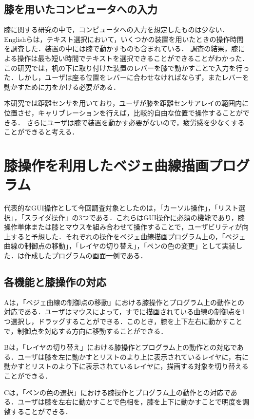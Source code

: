 \documentclass[submit, techrep]{ipsj}
\begin{document}
\subsection{膝を用いたコンピュータへの入力}
膝に関する研究の中で，コンピュータへの入力を想定したものは少ない．
Englishら\cite{1698228}は，テキスト選択において，いくつかの装置を用いたときの操作時間を調査した．装置の中には膝で動かすものも含まれている．
調査の結果，膝による操作は最も短い時間でテキストを選択できることができることがわかった．
この研究では，机の下に取り付けた装置のレバーを膝で動かすことで入力を行った．しかし，ユーザは座る位置をレバーに合わせなければならず，またレバーを動かすために力をかける必要がある．\par
本研究では距離センサを用いており，ユーザが膝を距離センサアレイの範囲内に位置させ，キャリブレーションを行えば，比較的自由な位置で操作することができる．
さらにユーザは膝で装置を動かす必要がないので，疲労感を少なくすることができると考える．

\section{膝操作を利用したベジェ曲線描画プログラム}
代表的なGUI操作として今回調査対象としたのは，「カーソル操作」，「リスト選択」，「スライダ操作」の3つである．これらはGUI操作に必須の機能であり，膝操作単体または膝とマウスを組み合わせて操作することで，ユーザビリティが向上すると予想した．それぞれの操作をベジェ曲線描画プログラム上の，「ベジェ曲線の制御点の移動」，「レイヤの切り替え」，「ペンの色の変更」として実装した．は作成したプログラムの画面一例である．
\subsection{各機能と膝操作の対応}
Aは，「ベジェ曲線の制御点の移動」における膝操作とプログラム上の動作との対応である．ユーザはマウスによって，すでに描画されている曲線の制御点を1つ選択し，ドラッグすることができる．このとき，膝を上下左右に動かすことで，制御点を対応する方向に移動することができる．\par
{}Bは，「レイヤの切り替え」における膝操作とプログラム上の動作との対応である．ユーザは膝を左に動かすとリストのより上に表示されているレイヤに，右に動かすとリストのより下に表示されているレイヤに，描画する対象を切り替えることができる．\par
{}Cは，「ペンの色の選択」における膝操作とプログラム上の動作との対応である．ユーザは膝を左右に動かすことで色相を，膝を上下に動かすことで明度を調整することができる．
\end{document}
